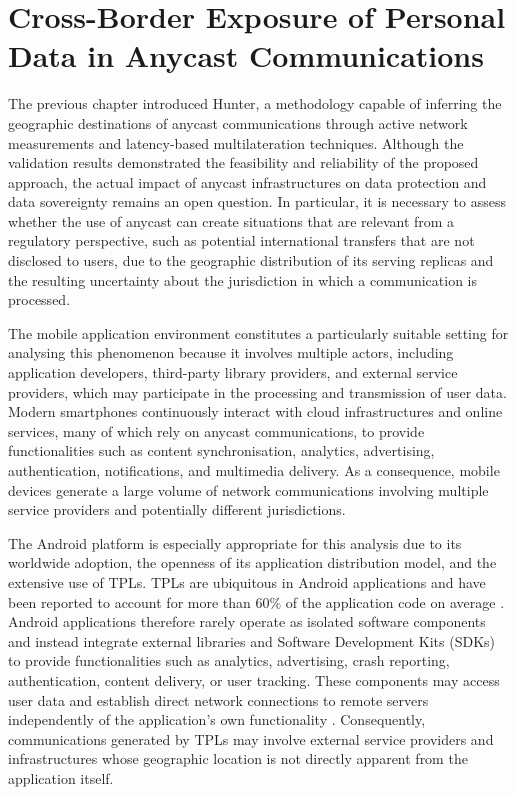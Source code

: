 \chapter{Cross-Border Exposure of Personal Data in Anycast Communications}
\label{ch:experiments}

The previous chapter introduced Hunter, a methodology capable of inferring the geographic destinations of anycast communications through active network measurements and latency-based multilateration techniques. Although the validation results demonstrated the feasibility and reliability of the proposed approach, the actual impact of anycast infrastructures on data protection and data sovereignty remains an open question. In particular, it is necessary to assess whether the use of anycast can create situations that are relevant from a regulatory perspective, such as potential international transfers that are not disclosed to users, due to the geographic distribution of its serving replicas and the resulting uncertainty about the jurisdiction in which a communication is processed.

The mobile application environment constitutes a particularly suitable setting for analysing this phenomenon because it involves multiple actors, including application developers, third-party library providers, and external service providers, which may participate in the processing and transmission of user data. Modern smartphones continuously interact with cloud infrastructures and online services, many of which rely on anycast communications, to provide functionalities such as content synchronisation, analytics, advertising, authentication, notifications, and multimedia delivery. As a consequence, mobile devices generate a large volume of network communications involving multiple service providers and potentially different jurisdictions.

The Android platform is especially appropriate for this analysis due to its worldwide adoption, the openness of its application distribution model, and the extensive use of TPLs. TPLs are ubiquitous in Android applications and have been reported to account for more than 60\% of the application code on average \cite{Wang2017UnderstandingAnalysis}. Android applications therefore rarely operate as isolated software components and instead integrate external libraries and Software Development Kits (SDKs) to provide functionalities such as analytics, advertising, crash reporting, authentication, content delivery, or user tracking. These components may access user data and establish direct network connections to remote servers independently of the application's own functionality \cite{He2019DynamicLibraries}. Consequently, communications generated by TPLs may involve external service providers and infrastructures whose geographic location is not directly apparent from the application itself.

